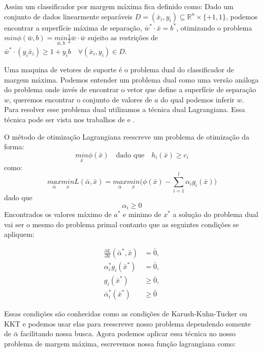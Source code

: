 Assim um classificador por margem máxima fica definido como: Dado um conjunto de dados linearmente separáveis $D=(\bar{x}_i,y_i) \subseteq \mathbb{R}^n\times\{+1,1\}$, podemos encontrar a superfície máxima de separação, $\bar{w}^*\cdot\bar{x}=b^*$, otimizando o problema $min\phi(\bar{w},b)=\underset{\bar{w},b}{min}\frac{1}{2}\bar{w}\cdot\bar{w}$ sujeito as restrições de $\bar{w}^*\cdot(y_i\bar{x}_i) \ge 1+y_i b \quad \forall (\bar{x}_i,y_i)\in D$.\par

Uma maquina de vetores de suporte é o problema dual do classificador de margem máxima. Podemos entender um problema dual como uma versão análoga do problema onde invés de encontrar o vetor que define a superfície de separação $w$, queremos encontrar o conjunto de valores de $a$ do qual podemos inferir $w$. Para resolver esse problema dual utilizamos a técnica dual Lagrangiana. Essa técnica pode ser vista nos trabalhos de \cite{art:LIVRO_SVM} e \cite{art:LIVRO_KAA}.

O método de otimização Lagrangiana reescreve um problema de otimização da forma:
\begin{equation}
\underset{\bar{x}}{min}\phi(\bar{x}) \quad \text{dado que} \quad h_i(\bar{x})\ge c_i
\end{equation}
como:
\begin{equation}
\underset{\bar{\alpha}}{max} \underset{\bar{x}}{min} L(\bar{\alpha},\bar{x}) = \underset{\bar{\alpha}}{max} \underset{\bar{x}}{min}\bigg(\phi(\bar{x})-\sum_{i=1}^{l}\alpha_i g_i(\bar{x})\bigg)
    \label{eq:LABEL_EQ_7}
\end{equation}
dado que
\begin{equation}
\alpha_i\ge0
    \label{eq:LABEL_EQ_8}
\end{equation}
Encontrados os valores máximo de $a^*$ e minimo de $x^*$ a solução do problema dual vai ser o mesmo do problema primal contanto que as seguintes condições se apliquem:

\begin{equation}
\begin{split}
\frac{\partial L}{\partial \bar{x}}(\bar{\alpha}^*,\bar{x})&=\bar{0}, \\
\alpha_i^*g_i(\bar{x}^*)&=\bar{0}, \\
g_i(\bar{x}^*)&\ge\bar{0} , \\
\bar{\alpha}_i^*(\bar{x}^*)&\ge\bar{0} 
\end{split}
\end{equation}

Essas condições são conhecidas como as condições de Karush-Kuhn-Tucker ou KKT e podemos usar elas para reescrever nosso problema dependendo somente de $\bar{\alpha}$ facilitando nossa busca. Agora podemos aplicar essa técnica no nosso problema de margem máxima, escrevemos nossa função lagrangiana como:

